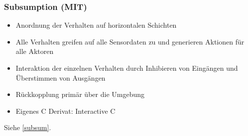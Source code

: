 \subsubsection{Subsumption (MIT)}
\begin{itemize}
	\item Anordnung der Verhalten auf horizontalen Schichten
	\item Alle Verhalten greifen auf alle Sensordaten zu und generieren Aktionen für alle Aktoren
	\item Interaktion der einzelnen Verhalten durch Inhibieren von Eingängen und Überstimmen von Ausgängen
	\item Rückkopplung primär über die Umgebung
	\item Eigenes C Derivat: Interactive C
\end{itemize}
Siehe \autoref{subsum}.
